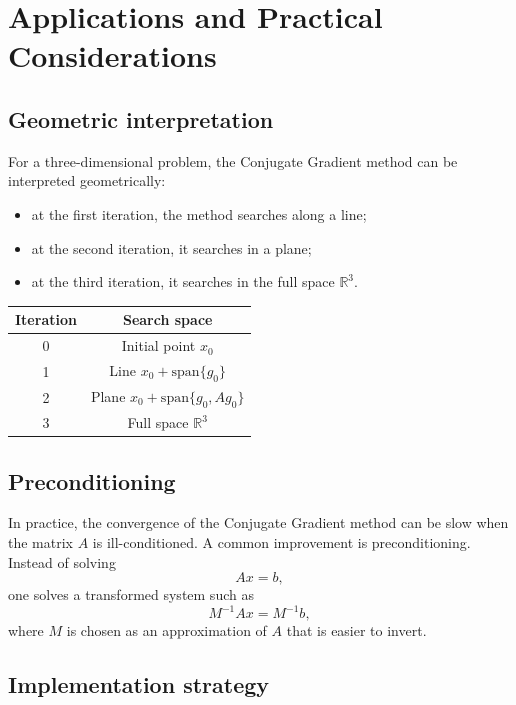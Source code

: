 \documentclass[11pt,a4paper]{report}
\theoremstyle{definition}
\theoremstyle{plain}
\theoremstyle{remark}
\begin{document}
\chapter{Applications and Practical Considerations}

\section{Geometric interpretation}

For a three-dimensional problem, the Conjugate Gradient method can be interpreted geometrically:
\begin{itemize}
    \item at the first iteration, the method searches along a line;
    \item at the second iteration, it searches in a plane;
    \item at the third iteration, it searches in the full space $\mathbb{R}^3$.
\end{itemize}

\begin{center}
\begin{tabular}{c|c}
\toprule
Iteration & Search space \\
\midrule
0 & Initial point $x_0$ \\
1 & Line $x_0+\mathrm{span}\{g_0\}$ \\
2 & Plane $x_0+\mathrm{span}\{g_0,Ag_0\}$ \\
3 & Full space $\mathbb{R}^3$ \\
\bottomrule
\end{tabular}
\end{center}

\section{Preconditioning}

In practice, the convergence of the Conjugate Gradient method can be slow when the matrix $A$ is ill-conditioned. A common improvement is preconditioning. Instead of solving
\[
Ax=b,
\]
one solves a transformed system such as
\[
M^{-1}Ax=M^{-1}b,
\]
where $M$ is chosen as an approximation of $A$ that is easier to invert.

\section{Implementation strategy}
\end{document}
